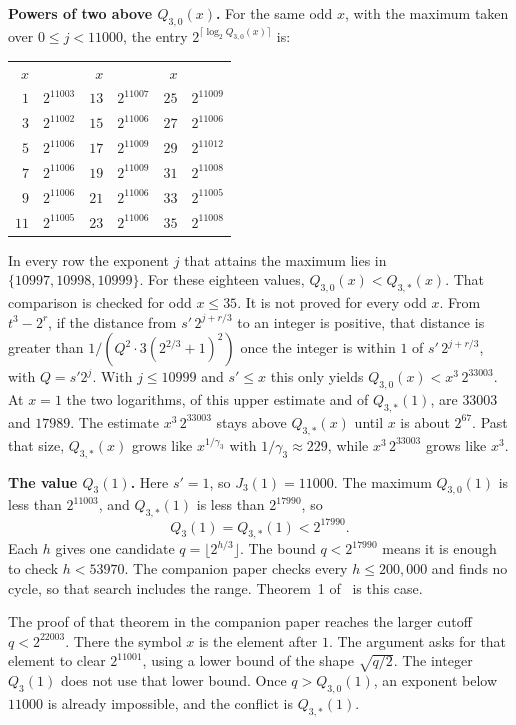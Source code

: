 \documentclass[11pt]{article}
\newcommand{\topic}[1]{\par\noindent\textbf{#1}}
\begin{document}
\topic{Powers of two above $Q_{3,0}(x)$.}
For the same odd $x$, with the maximum taken over $0 \le j < 11000$, the entry $2^{\lceil \log_2 Q_{3,0}(x) \rceil}$ is:

\begin{center}
\begin{tabular}{rrrrrr}
$x$ & & $x$ & & $x$ & \\
$1$ & $2^{11003}$ & $13$ & $2^{11007}$ & $25$ & $2^{11009}$ \\
$3$ & $2^{11002}$ & $15$ & $2^{11006}$ & $27$ & $2^{11006}$ \\
$5$ & $2^{11006}$ & $17$ & $2^{11009}$ & $29$ & $2^{11012}$ \\
$7$ & $2^{11006}$ & $19$ & $2^{11009}$ & $31$ & $2^{11008}$ \\
$9$ & $2^{11006}$ & $21$ & $2^{11006}$ & $33$ & $2^{11005}$ \\
$11$ & $2^{11005}$ & $23$ & $2^{11006}$ & $35$ & $2^{11008}$ \\
\end{tabular}
\end{center}

In every row the exponent $j$ that attains the maximum lies in $\{10997, 10998, 10999\}$.
For these eighteen values, $Q_{3,0}(x) < Q_{3,*}(x)$.
That comparison is checked for odd $x \le 35$.
It is not proved for every odd $x$.
From $t^3 - 2^r$, if the distance from $s'\, 2^{j+r/3}$ to an integer is positive, that distance is greater than $1/(Q^2 \cdot 3(2^{2/3}+1)^2)$ once the integer is within $1$ of $s'\, 2^{j+r/3}$, with $Q = s' 2^j$.
With $j \le 10999$ and $s' \le x$ this only yields $Q_{3,0}(x) < x^3\, 2^{33003}$.
At $x = 1$ the two logarithms, of this upper estimate and of $Q_{3,*}(1)$, are $33003$ and $17989$.
The estimate $x^3\, 2^{33003}$ stays above $Q_{3,*}(x)$ until $x$ is about $2^{67}$.
Past that size, $Q_{3,*}(x)$ grows like $x^{1/\gamma_3}$ with $1/\gamma_3 \approx 229$, while $x^3\, 2^{33003}$ grows like $x^3$.

\topic{The value $Q_3(1)$.}
Here $s' = 1$, so $J_3(1) = 11000$.
The maximum $Q_{3,0}(1)$ is less than $2^{11003}$, and $Q_{3,*}(1)$ is less than $2^{17990}$, so
\[
Q_3(1) = Q_{3,*}(1) < 2^{17990}.
\]
Each $h$ gives one candidate $q = \lfloor 2^{h/3} \rfloor$.
The bound $q < 2^{17990}$ means it is enough to check $h < 53970$.
The companion paper checks every $h \le 200{,}000$ and finds no cycle, so that search includes the range.
Theorem~1 of~\cite{hackman-i} is this case.

The proof of that theorem in the companion paper reaches the larger cutoff $q < 2^{22003}$.
There the symbol $x$ is the element after $1$.
The argument asks for that element to clear $2^{11001}$, using a lower bound of the shape $\sqrt{q/2}$.
The integer $Q_3(1)$ does not use that lower bound.
Once $q > Q_{3,0}(1)$, an exponent below $11000$ is already impossible, and the conflict is $Q_{3,*}(1)$.
\end{document}
